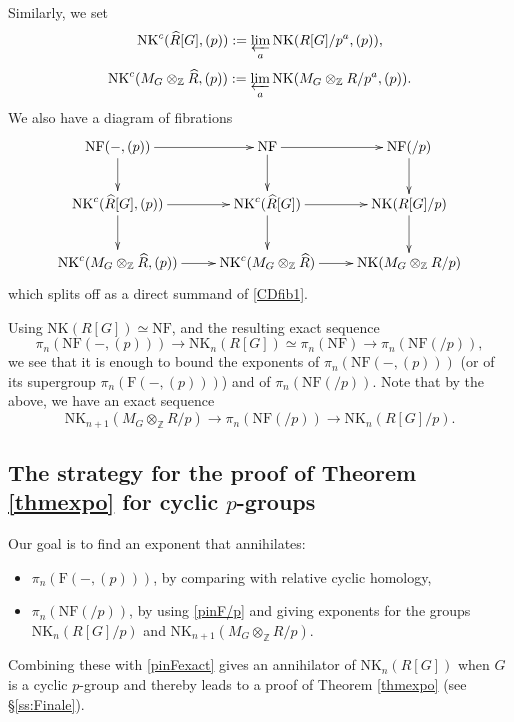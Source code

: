 \documentclass[reqno,11pt,letterpaper]{amsart}
\theoremstyle{plain}
\numberwithin{equation}{subsection}
\theoremstyle{remark}
\theoremstyle{plain}
\theoremstyle{definition}\newtheorem*{notation}{Notation}
\newcommand{\RF}{\mathrm{F}}
\newcommand{\RNF}{\mathrm{NF}}
\newcommand{\RNK}{\mathrm{NK}}
\newcommand{\BZ}{\mathbb{Z}}
\newcommand{\prolim}{\varprojlim}
\newcommand{\wh}{\widehat}
\begin{document}
Similarly, we set
\[
\RNK^c(\wh R[G], (p)):=\prolim_a \RNK(R[G]/p^a, (p)),
\]
\[
  \RNK^c(M_G\otimes_\BZ \wh R, (p)):=\prolim_a \RNK(M_G\otimes_\BZ  R/p^a, (p)).
\]
We also have a diagram of fibrations
\begin{equation}\label{CDfib2}
\begin{aligned}
\xymatrix{
\RNF(-,(p))\ar[r]\ar[d] & \RNF\ar[r]\ar[d] & \RNF(/p)\ar[d]\\
\RNK^c(\wh R[G], (p))\ar[r]\ar[d] &\RNK^c(\wh R[G]) \ar[r]\ar[d] & \RNK( R[G]/p)\ar[d]\\
\RNK^c(M_G\otimes_\BZ \wh R, (p)) \ar[r] & \RNK^c(M_G\otimes_\BZ \wh R)\ar[r] &\RNK( M_G\otimes_\BZ R/p)\\
}
\end{aligned}
\end{equation}
which  splits off as a direct summand of \eqref{CDfib1}.

Using $\RNK(R[G])\simeq \RNF$, and the resulting exact sequence
\begin{equation}\label{pinFexact}
  \pi_n(\RNF(-, (p)))\to  \RNK_n(R[G])\simeq \pi_n(\RNF)\to \pi_n(\RNF(/p))  ,
\end{equation}
we see that it is enough to bound the exponents of 
$\pi_n(\RNF(-, (p)))$ (or of its supergroup $\pi_n(\RF(-,(p)))$) and of $\pi_n(\RNF(/p))$.
Note that by the above, 
we have an exact sequence
\begin{equation}\label{pinF/p}
 \RNK_{n+1}(M_G\otimes_\BZ R/p) \to  \pi_n(\RNF(/p))\to \RNK_n(R[G]/p).
\end{equation}

 
 

 \subsection{The strategy for the proof of Theorem \ref{thmexpo} for cyclic $p$-groups}\label{ss:strategy}
   Our    goal is to find an exponent that annihilates:
  \begin{itemize}
  \item[A)]  $\pi_n(\RF(-, (p)))$, by comparing with relative
  cyclic homology,  
  
  \item[B)]  $\pi_n(\RNF(/p))$, by using \eqref{pinF/p} and giving exponents for the groups $\RNK_n(R[G]/p)$ and $\RNK_{n+1}(M_G\otimes_\BZ R/p)$. 
    \end{itemize}
  
  Combining these with \eqref{pinFexact}  gives an annihilator of  $\RNK_n(R[G])$ when $G$ is a cyclic $p$-group  and thereby leads to a proof of Theorem \ref{thmexpo} (see \S \ref{ss:Finale}).  
  
\end{document}
